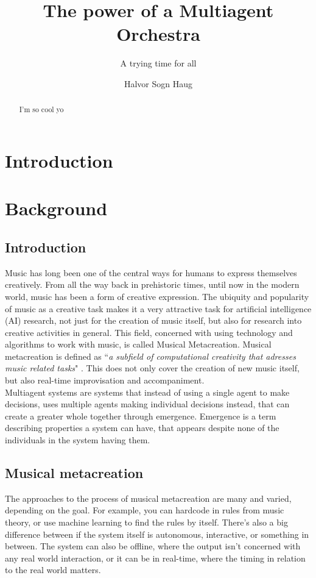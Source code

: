 \documentclass[a4paper,english]{report}
\title{The power of a Multiagent Orchestra}
\subtitle{A trying time for all}
\author{Halvor Sogn Haug}
\begin{document}
	\duoforside[dept={Institute of informatics},
	program={Informatics: Robotics and Intelligent Systems},
	long]
	\tableofcontents
	\begin{abstract}
		I'm so cool yo
	\end{abstract}
	\chapter{Introduction}
	\chapter{Background}
	\section{Introduction}
	Music has long been one of the central ways for humans to express themselves creatively. From all the way back in prehistoric times, until now in the modern world, music has been a form of creative expression. The ubiquity and popularity of music as a creative task makes it a very attractive task for artificial intelligence (AI) research, not just for the creation of music itself, but also for research into creative activities in general. This field, concerned with using technology and algorithms to work with music, is called Musical Metacreation. Musical metacreation is defined as ``\textit{a subfield of computational creativity that adresses music related tasks}" \cite{pasquier2017introduction}. This does not only cover the creation of new music itself, but also real-time improvisation and accompaniment.\\
	Multiagent systems are systems that instead of using a single agent to make decisions, uses multiple agents making individual decisions instead, that can create a greater whole  together through emergence. Emergence is a term describing properties a system can have, that appears despite none of the individuals in the system having them.
	
	\section{Musical metacreation}
	The approaches to the process of musical metacreation are many and varied, depending on the goal. For example, you can hardcode in rules from music theory, or use machine learning to find the rules by itself. There's also a big difference between if the system itself is autonomous, interactive, or something in between. The system can also be offline, where the output isn't concerned with any real world interaction, or it can be in real-time, where the timing in relation to the real world matters.
	
\end{document}

